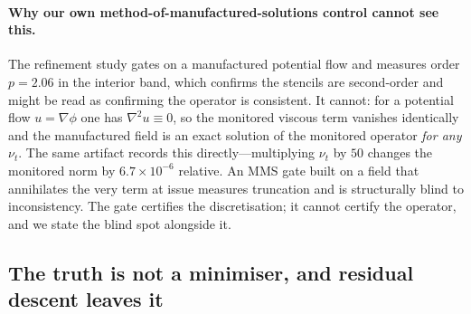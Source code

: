 \paragraph{Why our own method-of-manufactured-solutions control cannot see this.}
The refinement study gates on a manufactured potential flow and measures order
$p=2.06$ in the interior band, which confirms the stencils are second-order and might be
read as confirming the operator is consistent. It cannot: for a potential flow
$u=\nabla\phi$ one has $\nabla^2u\equiv0$, so the monitored viscous term vanishes
identically and the manufactured field is an exact solution of the monitored operator
\emph{for any} $\nu_t$. The same artifact records this directly---multiplying $\nu_t$ by
$50$ changes the monitored norm by $6.7\times10^{-6}$ relative. An MMS gate built on a
field that annihilates the very term at issue measures truncation and is structurally
blind to inconsistency. The gate certifies the discretisation; it cannot certify the
operator, and we state the blind spot alongside it.

\subsection{The truth is not a minimiser, and residual descent leaves it}

